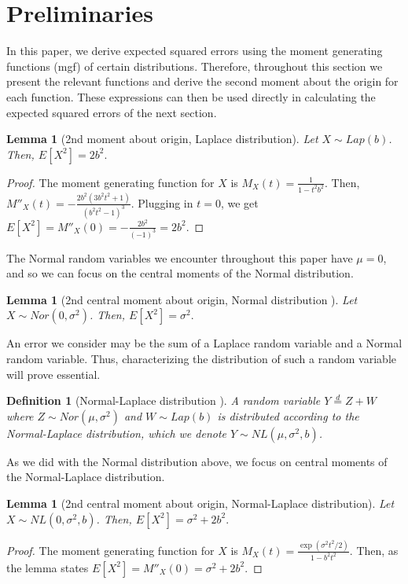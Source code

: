 \documentclass{article}
\theoremstyle{plain}
\newtheorem{lem}[thm]{Lemma}
\newtheorem{defn}[thm]{Definition}
\begin{document}
\section{Preliminaries}

In this paper, we derive expected squared errors using the moment generating functions (mgf) of certain distributions. Therefore, throughout this section we present the relevant functions and derive the second moment about the origin for each function. These expressions can then be used directly in calculating the expected squared errors of the next section. 

\begin{lem}[2nd moment about origin, Laplace distribution]
Let $X \sim Lap(b)$. Then, $E[X^2] = 2b^2.$
\end{lem}
\begin{proof}
The moment generating function for $X$ is $M_X(t) = \frac{1}{1 - t^2b^2}.$
Then, $M''_X(t) = -\frac{2b^2(3b^2t^2 + 1)}{(b^2t^2 - 1)^3}.$
Plugging in $t = 0$, we get 
$E[X^2] = M''_X(0) = -\frac{2b^2}{(-1)^3} = 2b^2.$
\end{proof}

The Normal random variables we encounter throughout this paper have $\mu = 0$, and so we can focus on the central moments of the Normal distribution.

\begin{lem}[2nd central moment about origin, Normal distribution \cite{papoulis2002probability}]
Let $X \sim Nor(0, \sigma^2)$. Then,
$E[X^2] = \sigma^2.$
\end{lem}

An error we consider may be the sum of a Laplace random variable and a Normal random variable. Thus, characterizing the distribution of such a random variable will prove essential.

\begin{defn}[Normal-Laplace distribution \cite{Reed2006}]
A random variable $Y \overset{d}{=} Z + W$ where $Z \sim Nor(\mu, \sigma^2)$ and $W \sim Lap(b)$ is distributed according to the Normal-Laplace distribution, which we denote $Y \sim NL(\mu, \sigma^2, b)$.
\end{defn}

As we did with the Normal distribution above, we focus on central moments of the Normal-Laplace distribution.

\begin{lem}[2nd central moment about origin, Normal-Laplace distribution]
\label{nl_secmom}
Let $X \sim NL(0, \sigma^2, b)$. Then, 
$E[X^2] = \sigma^2 + 2b^2.$
\end{lem}
\begin{proof}
The moment generating function for $X$ is
$M_X(t) = \frac{\exp(\sigma^2t^2/2)}{1 - b^2t^2}.$
Then, as the lemma states
$E[X^2] = M''_X(0) = \sigma^2 + 2b^2.$
\end{proof}
\end{document}
